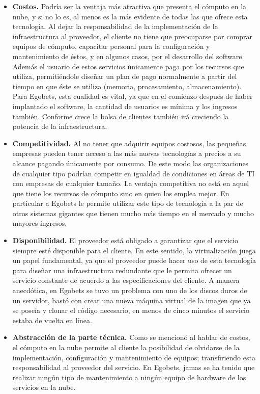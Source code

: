 \begin{itemize}
	\item \textbf{Costos.} Podría ser la ventaja más atractiva que presenta el cómputo en la nube, y si no lo es, al menos es la más evidente de todas las que ofrece esta tecnología. Al dejar la responsabilidad de la implementación de la infraestructura al proveedor, el cliente no tiene que preocuparse por comprar equipos de cómputo, capacitar personal para la configuración y mantenimiento de éstos, y en algunos casos, por el desarrollo del software. Además el usuario de estos servicios únicamente paga por los recursos que utiliza, permitiéndole diseñar un plan de pago normalmente a partir del tiempo en que éste se utiliza (memoria, procesamiento, almacenamiento). Para Egobets, esta cualidad es vital, ya que en el comienzo después de haber implantado el software, la cantidad de usuarios es mínima y los ingresos también. Conforme crece la bolsa de clientes también irá creciendo la potencia de la infraestructura.

	\item \textbf{Competitividad.} Al no tener que adquirir equipos costosos, las pequeñas empresas pueden tener acceso a las más nuevas tecnologías a precios a su alcance pagando únicamente por consumo. De este modo las organizaciones de cualquier tipo podrían competir en igualdad de condiciones en áreas de TI con empresas de cualquier tamaño. La ventaja competitiva no está en aquel que tiene los recursos de cómputo sino en quien los emplea mejor. En particular a Egobets le permite utilizar este tipo de tecnología a la par de otros sistemas gigantes que tienen mucho más tiempo en el mercado y mucho mayores ingresos.

	\item \textbf{Disponibilidad.} El proveedor está obligado a garantizar que el servicio siempre esté disponible para el cliente. En este sentido, la virtualización juega un papel fundamental, ya que el proveedor puede hacer uso de esta tecnología para diseñar una infraestructura redundante que le permita ofrecer un servicio constante de acuerdo a las especificaciones del cliente. A manera anecdótica, en Egobets se tuvo un problema con uno de los discos duros de un servidor, bastó con crear una nueva máquina virtual de la imagen que ya se poseía y clonar el código necesario, en menos de cinco minutos el servicio estaba de vuelta en línea.

	\item \textbf{Abstracción de la parte técnica.} Como se mencionó al hablar de costos, el cómputo en la nube permite al cliente la posibilidad de olvidarse de la implementación, configuración y mantenimiento de equipos; transfiriendo esta responsabilidad al proveedor del servicio. En Egobets, jamas se ha tenido que realizar ningún tipo de mantenimiento a ningún equipo de hardware de los servicios en la nube.


\end{itemize}
